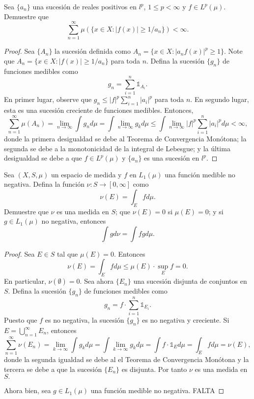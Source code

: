 \documentclass[12pt]{article}
\newenvironment{problem}[2][Problema]{\begin{trivlist}
\item[\hskip \labelsep {\bfseries #1}\hskip \labelsep {\bfseries #2.}]}{\end{trivlist}}
\begin{document}
\begin{problem}{17}
    Sea $\{a_n\}$ una sucesión de reales positivos en $l^p$, $1 \leq p < \infty$ y $f \in L^p(\mu)$. Demuestre que 
$$\sum_{n=1}^\infty \mu \left( \{x \in X: \lvert f(x) \rvert \geq 1 / a_n \} \right) < \infty.$$
\end{problem}
\begin{proof}
    Sea $\{A_n\}$ la sucesión definida como $A_n = \{ x\in X: \lvert a_n f(x) \rvert^p \geq 1\}.$ Note que $A_n = \{x \in X: \lvert f(x) \rvert \geq 1 / a_n \}$ para toda $n$. Defina la sucesión $\{g_n\}$ de funciones medibles como
    $$g_n =\sum_{i=1}^n \mathbb{1}_{A_i}.$$
    En primer lugar, observe que $g_n \leq \lvert f \rvert^p \sum_{i=1}^n \lvert a_i \rvert^p$ para toda $n$. En segundo lugar, esta es una sucesión creciente de funciones medibles. Entonces,
$$\sum_{n=1}^\infty \mu(A_n) = \lim_{n\to \infty} \int g_n d \mu = \int \lim_{n\to \infty} g_k d \mu \leq \int \lim_{n \to \infty} \lvert f \rvert^p \sum_{i=1}^n \lvert a_i \rvert^p d\mu < \infty,$$
donde la primera desigualdad se debe al Teorema de Convergencia Monótona; la segunda se debe a la monotonicidad de la integral de Lebesgue; y la última desigualdad se debe a que $f\in L^p(\mu)$ y $\{a_n\}$ es una sucesión en $l^p$.
\end{proof}



\begin{problem}{18}
    Sea $(X, S, \mu)$ un espacio de medida y $f$ en $L_1(\mu)$ una función medible no negativa. Defina la función $\nu: S \rightarrow [0, \infty]$ como
    $$\nu(E) = \int_E f d\mu.$$
    Demuestre que $\nu$ es una medida en $S$; que $\nu(E) = 0$ si $\mu(E) = 0$; y si $g \in L_1(\mu)$ no negativa, entonces
    $$\int g d \nu = \int fg d \mu.$$
\end{problem}
 \begin{proof}
     Sea $E \in S$ tal que $\mu(E) = 0.$ Entonces
     $$\nu(E) = \int_E f d \mu \leq \mu(E) \cdot \sup_E f = 0.$$
     En particular, $\nu(\emptyset) = 0.$ Sea ahora $\{E_n\}$ una sucesión disjunta de conjuntos en $S$. Defina la sucesión $\{g_n\}$ de funciones medibles como 
     $$g_n = f \cdot \sum_{i=1}^n \mathbb{1}_{E_i}.$$ 
     Puesto que $f$ es no negativa, la sucesión $\{g_n\}$ es no negativa y creciente. Si $E = \bigcup_{n=1}^\infty E_n$, entonces 
 $$\sum_{n=1}^\infty \nu(E_n) = \lim_{k \to \infty} \int g_k d\mu = \int \lim_{k\to \infty} g_k d \mu = \int f \cdot \mathbb{1}_E d \mu = \int_E f d \mu = \nu(E),$$
donde la segunda igualdad se debe al el Teorema de Convergencia Monótona y la tercera se debe a que la sucesión $\{E_n\}$ es disjunta. Por tanto $\nu$ es una medida en $S.$

Ahora bien, sea $g \in L_1(\mu)$ una función medible no negativa. FALTA
 \end{proof}
\end{document}

